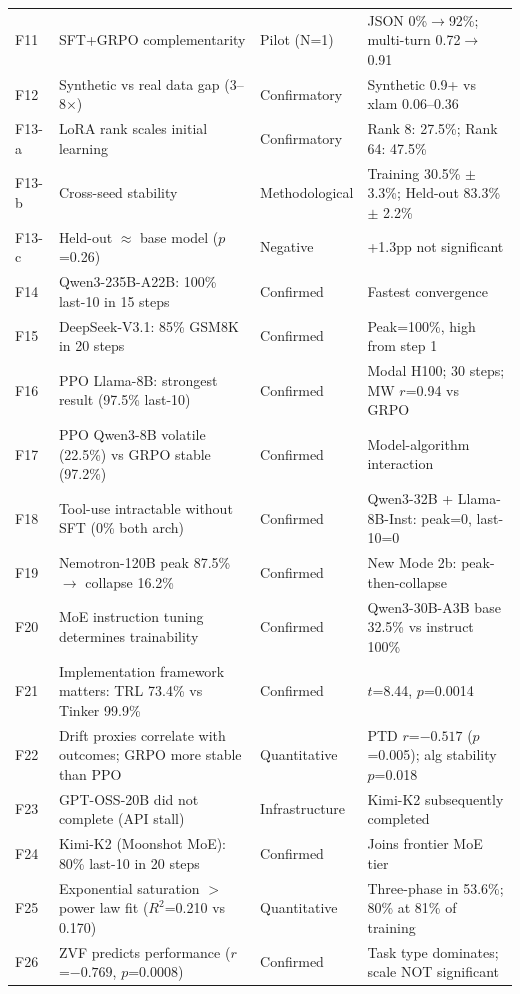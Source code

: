 \documentclass[12pt,a4paper]{report}
\theoremstyle{definition}
\begin{document}
\begin{small}
\begin{longtable}{p{0.5cm}p{7cm}p{2.3cm}p{4.5cm}}
F11 & SFT+GRPO complementarity & Pilot (N=1) & JSON 0\%$\to$92\%; multi-turn 0.72$\to$0.91 \\
F12 & Synthetic vs real data gap (3--8$\times$) & Confirmatory & Synthetic 0.9+ vs xlam 0.06--0.36 \\
F13-a & LoRA rank scales initial learning & Confirmatory & Rank 8: 27.5\%; Rank 64: 47.5\% \\
F13-b & Cross-seed stability & Methodological & Training 30.5\% $\pm$ 3.3\%; Held-out 83.3\% $\pm$ 2.2\% \\
F13-c & Held-out $\approx$ base model ($p$=0.26) & Negative & +1.3pp not significant \\
F14 & Qwen3-235B-A22B: 100\% last-10 in 15 steps & Confirmed & Fastest convergence \\
F15 & DeepSeek-V3.1: 85\% GSM8K in 20 steps & Confirmed & Peak=100\%, high from step 1 \\
F16 & PPO Llama-8B: strongest result (97.5\% last-10) & Confirmed & Modal H100; 30 steps; MW $r$=0.94 vs GRPO \\
F17 & PPO Qwen3-8B volatile (22.5\%) vs GRPO stable (97.2\%) & Confirmed & Model-algorithm interaction \\
F18 & Tool-use intractable without SFT (0\% both arch) & Confirmed & Qwen3-32B + Llama-8B-Inst: peak=0, last-10=0 \\
F19 & Nemotron-120B peak 87.5\% $\to$ collapse 16.2\% & Confirmed & New Mode 2b: peak-then-collapse \\
F20 & MoE instruction tuning determines trainability & Confirmed & Qwen3-30B-A3B base 32.5\% vs instruct 100\% \\
F21 & Implementation framework matters: TRL 73.4\% vs Tinker 99.9\% & Confirmed & $t$=8.44, $p$=0.0014 \\
F22 & Drift proxies correlate with outcomes; GRPO more stable than PPO & Quantitative & PTD $r$=$-0.517$ ($p$=0.005); alg stability $p$=0.018 \\
F23 & GPT-OSS-20B did not complete (API stall) & Infrastructure & Kimi-K2 subsequently completed \\
F24 & Kimi-K2 (Moonshot MoE): 80\% last-10 in 20 steps & Confirmed & Joins frontier MoE tier \\
F25 & Exponential saturation $>$ power law fit ($R^2$=0.210 vs 0.170) & Quantitative & Three-phase in 53.6\%; 80\% at 81\% of training \\
F26 & ZVF predicts performance ($r$=$-0.769$, $p$=0.0008) & Confirmed & Task type dominates; scale NOT significant \\

\end{longtable}
\end{small}
\end{document}
